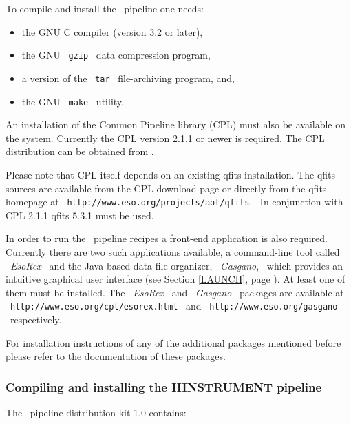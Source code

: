 To compile and install the \instname\, pipeline one needs:
\begin{itemize}
  \item the GNU C compiler (version 3.2 or later),
  \item the GNU \ \texttt{gzip} \ data compression program,
  \item a version of the \ \texttt{tar} \ file-archiving program, and,
  \item the GNU \ \texttt{make} \ utility.
\end{itemize}

An installation of the Common Pipeline library (CPL) must also be
available on the system. Currently the CPL version 2.1.1 or newer is required.
The CPL distribution can be obtained from \cite{CPL}.

Please note that CPL itself depends on an existing qfits installation.
The qfits sources are available from the CPL download page or directly from
the qfits homepage at \ \texttt{http://www.eso.org/projects/aot/qfits}. \ In
conjunction with CPL 2.1.1 qfits 5.3.1 must be used.

In order to run the \instname\, pipeline recipes a front-end application is also
required. Currently there are two such applications available, a
command-line tool called \ \textit{EsoRex} \ and the Java based data file
organizer, \ \textit{Gasgano}, \ which provides an intuitive graphical user
interface (see Section \ref{LAUNCH}, page \pageref{LAUNCH}). At least one 
of them must be installed. The \ \textit{EsoRex} \ and
\ \textit{Gasgano} \ packages are available at
\ \texttt{http://www.eso.org/cpl/esorex.html} \ and
\ \texttt{http://www.eso.org/gasgano} \ respectively.

For installation instructions of any of the additional packages mentioned
before please refer to the documentation of these packages.


\subsubsection{Compiling and installing the IIINSTRUMENT pipeline}
\label{PIP:compile-howto}

The \instname\, pipeline distribution kit 1.0 contains:


